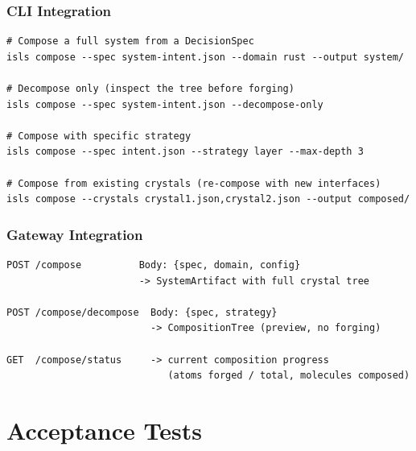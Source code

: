 \documentclass[11pt,a4paper,twoside]{article}
\theoremstyle{definition}
\theoremstyle{plain}
\theoremstyle{remark}
\begin{document}
\section{CLI Integration}\label{sec:cli}

\begin{lstlisting}
# Compose a full system from a DecisionSpec
isls compose --spec system-intent.json --domain rust --output system/

# Decompose only (inspect the tree before forging)
isls compose --spec system-intent.json --decompose-only

# Compose with specific strategy
isls compose --spec intent.json --strategy layer --max-depth 3

# Compose from existing crystals (re-compose with new interfaces)
isls compose --crystals crystal1.json,crystal2.json --output composed/
\end{lstlisting}


\section{Gateway Integration}\label{sec:gateway}

\begin{lstlisting}[title={New Gateway Endpoints}]
POST /compose          Body: {spec, domain, config}
                       -> SystemArtifact with full crystal tree

POST /compose/decompose  Body: {spec, strategy}
                         -> CompositionTree (preview, no forging)

GET  /compose/status     -> current composition progress
                            (atoms forged / total, molecules composed)
\end{lstlisting}


\part{Acceptance Tests}\label{part:tests}
\end{document}
